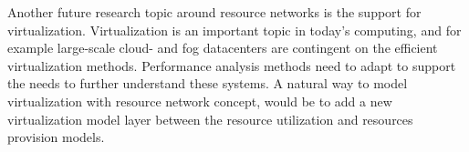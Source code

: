 Another future research topic around resource networks is the support for virtualization. Virtualization is an important topic in today's computing, and for example large-scale cloud- and fog datacenters are contingent on the efficient virtualization methods. Performance analysis methods need to adapt to support the needs to further understand these systems. A natural way to model virtualization with resource network concept, would be to add a new virtualization model layer between the resource utilization and resources provision models.

